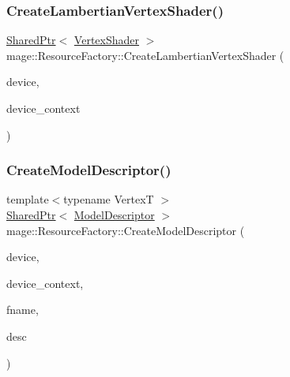 \hypertarget{classmage_1_1_resource_factory_a2cb9e994452637df64991f48b52e84a6}{}\label{classmage_1_1_resource_factory_a2cb9e994452637df64991f48b52e84a6} 
\subsubsection{\texorpdfstring{Create\+Lambertian\+Vertex\+Shader()}{CreateLambertianVertexShader()}}
{\footnotesize\ttfamily \hyperlink{namespacemage_a1e01ae66713838a7a67d30e44c67703e}{Shared\+Ptr}$<$ \hyperlink{classmage_1_1_vertex_shader}{Vertex\+Shader} $>$ mage\+::\+Resource\+Factory\+::\+Create\+Lambertian\+Vertex\+Shader (\begin{DoxyParamCaption}\item[{I\+D3\+D11\+Device2 $\ast$}]{device,  }\item[{I\+D3\+D11\+Device\+Context2 $\ast$}]{device\+\_\+context }\end{DoxyParamCaption})}

\hypertarget{classmage_1_1_resource_factory_ae27d9c780713784afcd02726ce959b8c}{}\label{classmage_1_1_resource_factory_ae27d9c780713784afcd02726ce959b8c} 
\subsubsection{\texorpdfstring{Create\+Model\+Descriptor()}{CreateModelDescriptor()}}
{\footnotesize\ttfamily template$<$typename VertexT $>$ \\
\hyperlink{namespacemage_a1e01ae66713838a7a67d30e44c67703e}{Shared\+Ptr}$<$ \hyperlink{classmage_1_1_model_descriptor}{Model\+Descriptor} $>$ mage\+::\+Resource\+Factory\+::\+Create\+Model\+Descriptor (\begin{DoxyParamCaption}\item[{I\+D3\+D11\+Device2 $\ast$}]{device,  }\item[{I\+D3\+D11\+Device\+Context2 $\ast$}]{device\+\_\+context,  }\item[{const wstring \&}]{fname,  }\item[{const \hyperlink{structmage_1_1_mesh_descriptor}{Mesh\+Descriptor}$<$ VertexT $>$ \&}]{desc }\end{DoxyParamCaption})}

